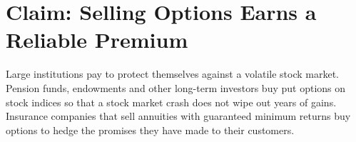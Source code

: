 \makeatletter
{}
\makeatother

\makeatletter
\makeatother

\chapter{Claim: Selling Options Earns a Reliable Premium}
\label{ch:18}
\providecommand{\term}[1]{\emph{#1}}

Large institutions pay to protect themselves against a volatile stock market. Pension funds, endowments and other long-term investors buy put options on stock indices so that a stock market crash does not wipe out years of gains. Insurance companies that sell annuities with guaranteed minimum returns buy options to hedge the promises they have made to their customers.

